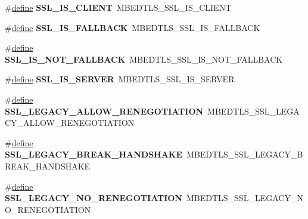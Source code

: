 \begin{DoxyCompactItemize}
\#\hyperlink{structdefine}{define} {\bfseries S\+S\+L\+\_\+\+I\+S\+\_\+\+C\+L\+I\+E\+NT}~M\+B\+E\+D\+T\+L\+S\+\_\+\+S\+S\+L\+\_\+\+I\+S\+\_\+\+C\+L\+I\+E\+NT
\item 
\mbox{\label{compat-1_83_8h_a4b53466ef9f2abd82ab94bc5ca19ea2f}} 
\#\hyperlink{structdefine}{define} {\bfseries S\+S\+L\+\_\+\+I\+S\+\_\+\+F\+A\+L\+L\+B\+A\+CK}~M\+B\+E\+D\+T\+L\+S\+\_\+\+S\+S\+L\+\_\+\+I\+S\+\_\+\+F\+A\+L\+L\+B\+A\+CK
\item 
\mbox{\label{compat-1_83_8h_a7a0cc18c5f6cf8bca6d10e9f978921d1}} 
\#\hyperlink{structdefine}{define} {\bfseries S\+S\+L\+\_\+\+I\+S\+\_\+\+N\+O\+T\+\_\+\+F\+A\+L\+L\+B\+A\+CK}~M\+B\+E\+D\+T\+L\+S\+\_\+\+S\+S\+L\+\_\+\+I\+S\+\_\+\+N\+O\+T\+\_\+\+F\+A\+L\+L\+B\+A\+CK
\item 
\mbox{\label{compat-1_83_8h_a8fe8b6c95281a7048839f8b30713ff35}} 
\#\hyperlink{structdefine}{define} {\bfseries S\+S\+L\+\_\+\+I\+S\+\_\+\+S\+E\+R\+V\+ER}~M\+B\+E\+D\+T\+L\+S\+\_\+\+S\+S\+L\+\_\+\+I\+S\+\_\+\+S\+E\+R\+V\+ER
\item 
\mbox{\label{compat-1_83_8h_af85d1bdb4c936effdabd3b6bf3d953c5}} 
\#\hyperlink{structdefine}{define} {\bfseries S\+S\+L\+\_\+\+L\+E\+G\+A\+C\+Y\+\_\+\+A\+L\+L\+O\+W\+\_\+\+R\+E\+N\+E\+G\+O\+T\+I\+A\+T\+I\+ON}~M\+B\+E\+D\+T\+L\+S\+\_\+\+S\+S\+L\+\_\+\+L\+E\+G\+A\+C\+Y\+\_\+\+A\+L\+L\+O\+W\+\_\+\+R\+E\+N\+E\+G\+O\+T\+I\+A\+T\+I\+ON
\item 
\mbox{\label{compat-1_83_8h_a31c3d047a20d178a4228eb3740a7a24f}} 
\#\hyperlink{structdefine}{define} {\bfseries S\+S\+L\+\_\+\+L\+E\+G\+A\+C\+Y\+\_\+\+B\+R\+E\+A\+K\+\_\+\+H\+A\+N\+D\+S\+H\+A\+KE}~M\+B\+E\+D\+T\+L\+S\+\_\+\+S\+S\+L\+\_\+\+L\+E\+G\+A\+C\+Y\+\_\+\+B\+R\+E\+A\+K\+\_\+\+H\+A\+N\+D\+S\+H\+A\+KE
\item 
\mbox{\label{compat-1_83_8h_a63a004d5c7caac017c62bbfcfa533eae}} 
\#\hyperlink{structdefine}{define} {\bfseries S\+S\+L\+\_\+\+L\+E\+G\+A\+C\+Y\+\_\+\+N\+O\+\_\+\+R\+E\+N\+E\+G\+O\+T\+I\+A\+T\+I\+ON}~M\+B\+E\+D\+T\+L\+S\+\_\+\+S\+S\+L\+\_\+\+L\+E\+G\+A\+C\+Y\+\_\+\+N\+O\+\_\+\+R\+E\+N\+E\+G\+O\+T\+I\+A\+T\+I\+ON
\item 
\mbox{\label{compat-1_83_8h_a06a288ea509f8e76fcb52a5f46cb3908}} 

\end{DoxyCompactItemize}
